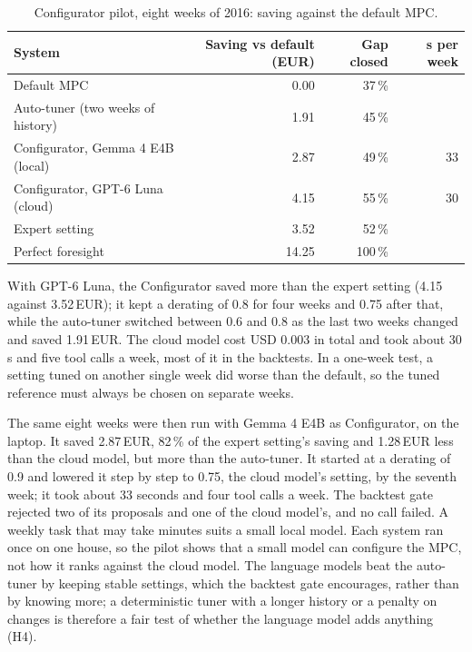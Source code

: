 \documentclass[12pt,a4paper]{report}
\begin{document}
\begin{table}[htbp]
\caption{Configurator pilot, eight weeks of 2016: saving against the
default MPC.}
\label{tab:configpilot}
\small
\begin{tabularx}{\textwidth}{@{}Xrrr@{}}
\toprule
System & Saving vs default (EUR) & Gap closed & s per week \\
\midrule
Default MPC & 0.00 & 37\,\% & \\
Auto-tuner (two weeks of history) & 1.91 & 45\,\% & \\
Configurator, Gemma 4 E4B (local) & 2.87 & 49\,\% & 33 \\
Configurator, GPT-6 Luna (cloud) & 4.15 & 55\,\% & 30 \\
Expert setting & 3.52 & 52\,\% & \\
Perfect foresight & 14.25 & 100\,\% & \\
\bottomrule
\end{tabularx}
\end{table}

With GPT-6 Luna, the Configurator saved more than the expert setting
(4.15 against 3.52\,EUR); it kept a derating of 0.8 for four weeks and
0.75 after that, while the auto-tuner switched between 0.6 and 0.8 as
the last two weeks changed and saved 1.91\,EUR. The cloud model cost
USD 0.003 in total and took about 30\,s and five tool calls a week,
most of it in the backtests. In a one-week test, a setting tuned on
another single week did worse than the default, so the tuned reference
must always be chosen on separate weeks.

The same eight weeks were then run with Gemma 4 E4B as Configurator, on
the laptop. It saved 2.87\,EUR, 82\,\% of the expert setting's saving
and 1.28\,EUR less than the cloud model, but more than the auto-tuner.
It started at a derating of 0.9 and lowered it step by step to 0.75,
the cloud model's setting, by the seventh week; it took about 33 seconds
and four tool calls a week. The backtest gate rejected two of its
proposals and one of the cloud model's, and no call failed. A weekly
task that may take minutes suits a small local model. Each system ran
once on one house, so the pilot shows that a small model can configure
the MPC, not how it ranks against the cloud model. The language models
beat the auto-tuner by keeping stable settings, which the backtest gate
encourages, rather than by knowing more; a deterministic tuner with a
longer history or a penalty on changes is therefore a fair test of
whether the language model adds anything (H4).
\end{document}
